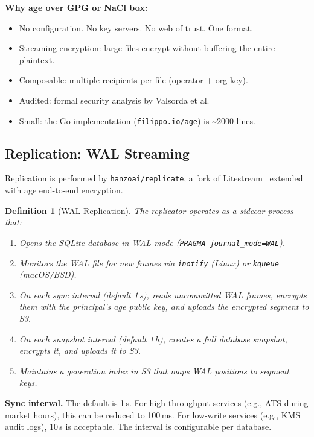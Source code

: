 \documentclass[11pt,a4paper]{article}
\newtheorem{definition}{Definition}[section]
\begin{document}
\noindent\textbf{Why age over GPG or NaCl box:}

\begin{itemize}[nosep]
  \item No configuration. No key servers. No web of trust. One format.
  \item Streaming encryption: large files encrypt without buffering
    the entire plaintext.
  \item Composable: multiple recipients per file (operator + org key).
  \item Audited: formal security analysis by Valsorda et al.
  \item Small: the Go implementation (\texttt{filippo.io/age}) is
    \textasciitilde2000 lines.
\end{itemize}

\subsection{Replication: WAL Streaming}\label{sec:replication}

Replication is performed by \texttt{hanzoai/replicate}, a fork of
Litestream~\cite{litestream} extended with age end-to-end encryption.

\begin{definition}[WAL Replication]\label{def:wal}
The replicator operates as a sidecar process that:
\begin{enumerate}[nosep]
  \item Opens the SQLite database in WAL mode
    (\texttt{PRAGMA journal\_mode=WAL}).
  \item Monitors the WAL file for new frames via \texttt{inotify}
    (Linux) or \texttt{kqueue} (macOS/BSD).
  \item On each sync interval (default 1\,s), reads uncommitted WAL
    frames, encrypts them with the principal's age public key, and
    uploads the encrypted segment to S3.
  \item On each snapshot interval (default 1\,h), creates a full
    database snapshot, encrypts it, and uploads it to S3.
  \item Maintains a generation index in S3 that maps WAL positions
    to segment keys.
\end{enumerate}
\end{definition}

\noindent\textbf{Sync interval.} The default is 1\,s. For
high-throughput services (e.g., ATS during market hours), this can be
reduced to 100\,ms. For low-write services (e.g., KMS audit logs),
10\,s is acceptable. The interval is configurable per database.
\end{document}
